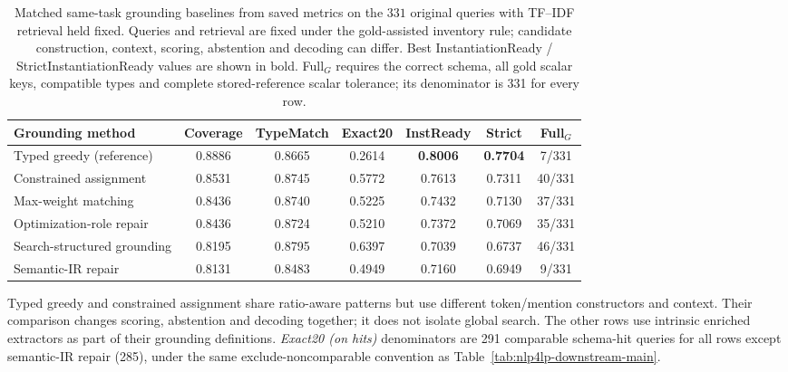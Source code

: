 \documentclass[pdflatex,sn-basic,Numbered]{sn-jnl}
\begin{document}
\begin{table}[t]
  \centering
  \caption{Matched same-task grounding baselines from saved metrics on the $331$ original queries with TF--IDF retrieval held fixed. Queries and retrieval are fixed under the gold-assisted inventory rule; candidate construction, context, scoring, abstention and decoding can differ. Best InstantiationReady / StrictInstantiationReady values are shown in bold. Full$_G$ requires the correct schema, all gold scalar keys, compatible types and complete stored-reference scalar tolerance; its denominator is 331 for every row.}
  \label{tab:nlp4lp-grounding-baselines}
  \scriptsize
  \setlength{\tabcolsep}{2.2pt}
  \renewcommand{\arraystretch}{1.12}
  \begin{tabular}{@{}lcccccc@{}}
    \toprule
    Grounding method & Coverage & TypeMatch & Exact20 & InstReady & Strict & Full$_G$ \\
    \midrule
    Typed greedy (reference) & 0.8886 & 0.8665 & 0.2614 & \textbf{0.8006} & \textbf{0.7704} & 7/331 \\
    Constrained assignment & 0.8531 & 0.8745 & 0.5772 & 0.7613 & 0.7311 & 40/331 \\
    Max-weight matching & 0.8436 & 0.8740 & 0.5225 & 0.7432 & 0.7130 & 37/331 \\
    Optimization-role repair & 0.8436 & 0.8724 & 0.5210 & 0.7372 & 0.7069 & 35/331 \\
    Search-structured grounding & 0.8195 & 0.8795 & 0.6397 & 0.7039 & 0.6737 & 46/331 \\
    Semantic-IR repair & 0.8131 & 0.8483 & 0.4949 & 0.7160 & 0.6949 & 9/331 \\
    \bottomrule
  \end{tabular}

  \vspace{2mm}
  \raggedright
  \footnotesize
  Typed greedy and constrained assignment share ratio-aware patterns but use different token/mention constructors and context. Their comparison changes scoring, abstention and decoding together; it does not isolate global search. The other rows use intrinsic enriched extractors as part of their grounding definitions. \textit{Exact20 (on hits)} denominators are 291 comparable schema-hit queries for all rows except semantic-IR repair (285), under the same exclude-noncomparable convention as Table~\ref{tab:nlp4lp-downstream-main}.
\end{table}


\end{document}

